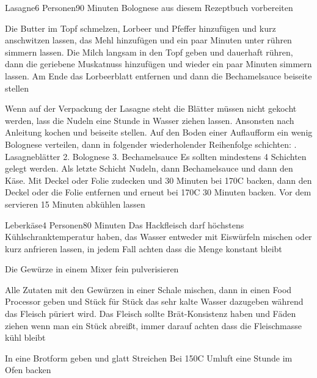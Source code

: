 \begin{recipe}{Lasagne}{6 Personen}{90 Minuten}
Bolognese aus diesem Rezeptbuch vorbereiten

Die Butter im Topf schmelzen, Lorbeer und Pfeffer hinzufügen und kurz anschwitzen lassen, das Mehl hinzufügen und ein paar Minuten unter rühren simmern lassen. Die Milch langsam in den Topf geben und dauerhaft rühren, dann die geriebene Muskatnuss hinzufügen und wieder ein paar Minuten simmern lassen. Am Ende das Lorbeerblatt entfernen und dann die Bechamelsauce beiseite stellen

Wenn auf der Verpackung der Lasagne steht die Blätter müssen nicht gekocht werden, lass die Nudeln eine Stunde in Wasser ziehen lassen. Ansonsten nach Anleitung kochen und beiseite stellen. Auf den Boden einer Auflaufform ein wenig Bolognese verteilen, dann in folgender wiederholender Reihenfolge schichten: . Lasagneblätter
2. Bolognese
3. Bechamelsauce
\newline
Es sollten mindestens 4 Schichten gelegt werden. Als letzte Schicht Nudeln, dann Bechamelsauce und dann den Käse.
Mit Deckel oder Folie zudecken und 30 Minuten bei 170\0C backen, dann den Deckel oder die Folie entfernen und erneut bei 170\0C 30 Minuten backen. Vor dem servieren 15 Minuten abkühlen lassen
\end{recipe}


\begin{recipe}{Leberkäse}{4 Personen}{80 Minuten}
\ing[Info]{}{}
Das Hackfleisch darf höchstens Kühlschranktemperatur haben, das Wasser entweder mit Eiswürfeln mischen oder kurz anfrieren lassen, in jedem Fall achten dass die Menge konstant bleibt

Die Gewürze in einem Mixer fein pulverisieren

Alle Zutaten mit den Gewürzen in einer Schale mischen, dann in einen Food Processor geben und Stück für Stück das sehr kalte Wasser dazugeben während das Fleisch püriert wird.
Das Fleisch sollte Brät-Konsistenz haben und Fäden ziehen wenn man ein Stück abreißt, immer darauf achten dass die Fleischmasse kühl bleibt

\ing[]{}{}
In eine Brotform geben und glatt Streichen
Bei 150\0C Umluft eine Stunde im Ofen backen
\end{recipe}

